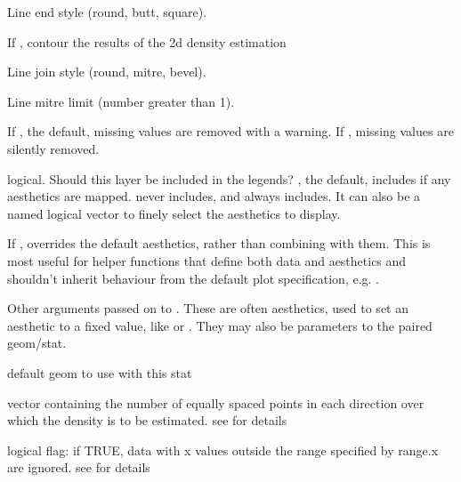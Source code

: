 \documentclass[a4paper]{book}
\begin{document}
\begin{Arguments}
\begin{ldescription}
\item[\code{lineend}] Line end style (round, butt, square).

\item[\code{contour}] If , contour the results of the 2d density
estimation

\item[\code{linejoin}] Line join style (round, mitre, bevel).

\item[\code{linemitre}] Line mitre limit (number greater than 1).

\item[\code{na.rm}] If , the default, missing values are removed with
a warning. If , missing values are silently removed.

\item[\code{show.legend}] logical. Should this layer be included in the legends?
, the default, includes if any aesthetics are mapped.
 never includes, and  always includes.
It can also be a named logical vector to finely select the aesthetics to
display.

\item[\code{inherit.aes}] If , overrides the default aesthetics,
rather than combining with them. This is most useful for helper functions
that define both data and aesthetics and shouldn't inherit behaviour from
the default plot specification, e.g. .

\item[\code{...}] Other arguments passed on to . These are
often aesthetics, used to set an aesthetic to a fixed value, like
 or . They may also be parameters
to the paired geom/stat.

\item[\code{geom}] default geom to use with this stat

\item[\code{grid\_size}] vector containing the number of equally spaced points in each
direction over which the density is to be estimated. see
 for details

\item[\code{truncate}] logical flag: if TRUE, data with x values outside the range
specified by range.x are ignored. see 
for details
\end{ldescription}
\end{Arguments}
\end{document}
